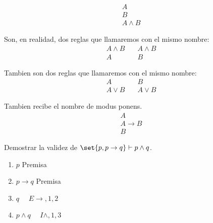 \begin{definition}
	\[
		\begin{array}{c}
			A \\
			B \\
			\hline
			A \wedge  B
		\end{array}
	\]
\end{definition}
\begin{definition}
	Son, en realidad, dos reglas que llamaremos con el mismo nombre:
	\[
		\begin{array}{c}
			A \wedge B \\
			\hline A
		\end{array} \quad \begin{array}{c }
			A \wedge B \\
			\hline B
		\end{array}
	\]
\end{definition}

\begin{definition}
	Tambien son dos reglas que llamaremos con el mismo nombre:
	\[
		\begin{array}{c}
			A \\
			\hline A \vee B
		\end{array} \quad \begin{array}{c }
			B \\
			\hline A \vee B
		\end{array}
	\]
\end{definition}

\begin{definition}
	Tambien recibe el nombre de modus ponens.
	\[
		\begin{array}{c}
			A               \\
			A \rightarrow B \\
			\hline
			B
		\end{array}
	\]
\end{definition}

\begin{example}
	Demostrar la validez de \(\set{p, p\rightarrow q} \vdash p \wedge  q \).

	\begin{enumerate}
		\item \(p \) Premisa
		\item \(p \rightarrow q \) Premisa
		\item \(q \quad\) \(E \rightarrow, 1,2 \)
		\item \(p \wedge  q \quad\) \(I \wedge ,1,3\)
	\end{enumerate}
\end{example}

